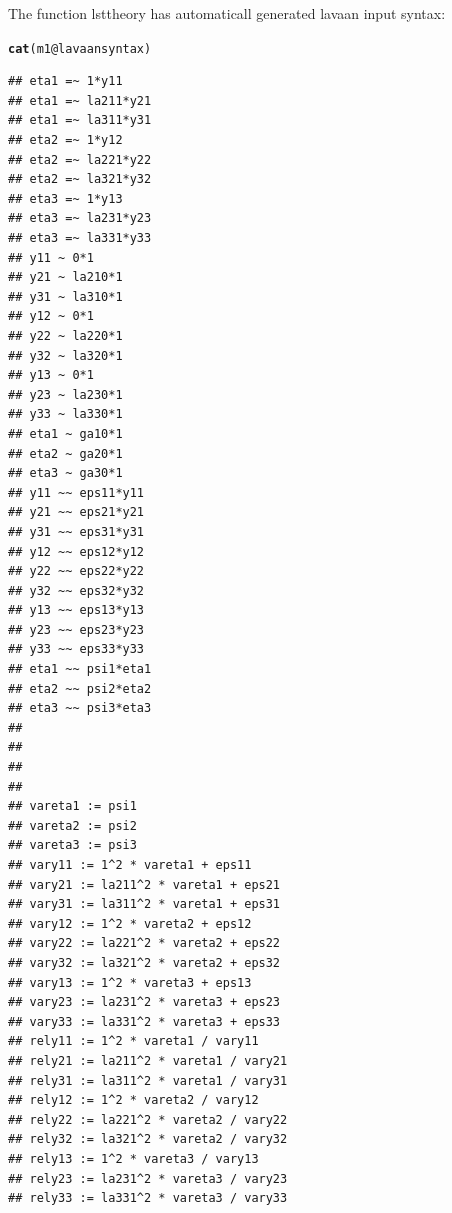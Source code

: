 \documentclass[10pt]{article}\usepackage{graphicx, color}
\makeatletter
\newcommand{\hlfunctioncall}[1]{\textcolor[rgb]{0.501960784313725,0,0.329411764705882}{\textbf{#1}}}%
\newenvironment{kframe}{%
 \def\at@end@of@kframe{}%
 \ifinner\ifhmode%
  \def\at@end@of@kframe{\end{minipage}}%
  \begin{minipage}{\columnwidth}%
 \fi\fi%
 \def\FrameCommand##1{\hskip\@totalleftmargin \hskip-\fboxsep
 \colorbox{shadecolor}{##1}\hskip-\fboxsep
     \hskip-\linewidth \hskip-\@totalleftmargin \hskip\columnwidth}%
 \MakeFramed {\advance\hsize-\width
   \@totalleftmargin\z@ \linewidth\hsize
   \@setminipage}}%
 {\par\unskip\endMakeFramed%
 \at@end@of@kframe}
\newenvironment{knitrout}{}{} %
\makeatother
\begin{document}
The function lsttheory has automaticall generated lavaan input syntax:
%
\begin{knitrout}
\color{fgcolor}\begin{kframe}
\begin{alltt}
\hlfunctioncall{cat}(m1@lavaansyntax)
\end{alltt}
\begin{verbatim}
## eta1 =~ 1*y11
## eta1 =~ la211*y21
## eta1 =~ la311*y31
## eta2 =~ 1*y12
## eta2 =~ la221*y22
## eta2 =~ la321*y32
## eta3 =~ 1*y13
## eta3 =~ la231*y23
## eta3 =~ la331*y33
## y11 ~ 0*1
## y21 ~ la210*1
## y31 ~ la310*1
## y12 ~ 0*1
## y22 ~ la220*1
## y32 ~ la320*1
## y13 ~ 0*1
## y23 ~ la230*1
## y33 ~ la330*1
## eta1 ~ ga10*1
## eta2 ~ ga20*1
## eta3 ~ ga30*1
## y11 ~~ eps11*y11
## y21 ~~ eps21*y21
## y31 ~~ eps31*y31
## y12 ~~ eps12*y12
## y22 ~~ eps22*y22
## y32 ~~ eps32*y32
## y13 ~~ eps13*y13
## y23 ~~ eps23*y23
## y33 ~~ eps33*y33
## eta1 ~~ psi1*eta1
## eta2 ~~ psi2*eta2
## eta3 ~~ psi3*eta3
## 
## 
## 
## 
## vareta1 := psi1
## vareta2 := psi2
## vareta3 := psi3
## vary11 := 1^2 * vareta1 + eps11
## vary21 := la211^2 * vareta1 + eps21
## vary31 := la311^2 * vareta1 + eps31
## vary12 := 1^2 * vareta2 + eps12
## vary22 := la221^2 * vareta2 + eps22
## vary32 := la321^2 * vareta2 + eps32
## vary13 := 1^2 * vareta3 + eps13
## vary23 := la231^2 * vareta3 + eps23
## vary33 := la331^2 * vareta3 + eps33
## rely11 := 1^2 * vareta1 / vary11
## rely21 := la211^2 * vareta1 / vary21
## rely31 := la311^2 * vareta1 / vary31
## rely12 := 1^2 * vareta2 / vary12
## rely22 := la221^2 * vareta2 / vary22
## rely32 := la321^2 * vareta2 / vary32
## rely13 := 1^2 * vareta3 / vary13
## rely23 := la231^2 * vareta3 / vary23
## rely33 := la331^2 * vareta3 / vary33
\end{verbatim}
\end{kframe}
\end{knitrout}
\end{document}
